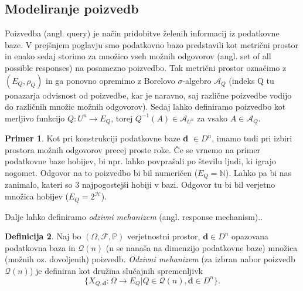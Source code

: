 \documentclass[12pt,a4paper]{amsart}
\theoremstyle{definition} %
\newtheorem{definicija}{Definicija}[section]
\newtheorem{primer}[definicija]{Primer}
\theoremstyle{plain} %
\begin{document}
\subsection{Modeliranje poizvedb}
Poizvedba (angl. query) je način pridobitve želenih informacij iz podatkovne baze. V prejšnjem poglavju smo podatkovno bazo predstavili kot metrični prostor in enako sedaj storimo za množico vseh možnih odgovorov (angl. set of all possible responses) na posamezno poizvedbo. Tak metrični prostor označimo z $(E_{Q}, \rho_{Q})$ in ga ponovno opremimo z Borelovo $\sigma$-algebro $\mathcal{A}_{Q}$ (indeks Q tu ponazarja odvisnost od poizvedbe, kar je naravno, saj različne poizvedbe vodijo do različnih množic možnih odgovorov). Sedaj lahko definiramo poizvedbo kot merljivo funkcijo $Q: U^n \rightarrow E_{Q} $, torej $Q^{-1}(A) \in \mathcal{A}_{U^n}$ za vsako $A \in \mathcal{A}_Q$.
\begin{primer} Kot pri konstrukciji podatkovne baze \textbf{d} $\in D^n$, imamo tudi pri izbiri prostora možnih odgovorov precej proste roke. Če se vrnemo na primer podatkovne baze hobijev, bi npr. lahko povprašali po številu ljudi, ki igrajo nogomet. Odgovor na to poizvedbo bi bil numeričen ($E_{Q} = \mathbb{N}$). Lahko pa bi nas zanimalo, kateri so 3 najpogostejši hobiji v bazi. Odgovor tu bi bil verjetno množica hobijev  ($E_{Q} = 2^\mathcal{H}$).
\end{primer}
\newline
\newline
Dalje lahko definiramo \textit{odzivni mehanizem} (angl. response mechanism).. 
\begin{definicija}
Naj bo $(\Omega , \mathcal{F}, \mathbb {P} )$ verjetnostni prostor, $\textbf{d}\in D^n$ opazovana podatkovna baza in $\mathcal{Q}(n)$ (n se nanaša na dimenzijo podatkovne baze) množica (možnih oz. dovoljenih) poizvedb. \textit{Odzivni mehanizem} (za izbran nabor poizvedb $\mathcal{Q}(n)$) je definiran kot družina slučajnih spremenljivk
\begin{equation}\label{odzivni}
 \{X_{Q,\textbf{d}} : \Omega \rightarrow  E_{Q} | Q \in  \mathcal{Q} (n), \textbf{d} \in D^n\} \tag{1}.
\end{equation} 
\end{definicija}
\end{document}

